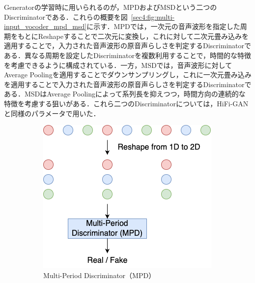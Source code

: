 \documentclass[12pt]{jarticle}
\numberwithin{equation}{section}    %
\numberwithin{figure}{section}      %
\numberwithin{table}{section}      %
\begin{document}
Generatorの学習時に用いられるのが，MPDおよびMSDという二つのDiscriminatorである．これらの概要を図~\ref{sec4:fig:multi-input_vocoder_mpd_msd}に示す．MPDでは，一次元の音声波形を指定した周期をもとにReshapeすることで二次元に変換し，これに対して二次元畳み込みを適用することで，入力された音声波形の原音声らしさを判定するDiscriminatorである．異なる周期を設定したDiscriminatorを複数利用することで，時間的な特徴を考慮できるように構成されている．一方，MSDでは，音声波形に対してAverage Poolingを適用することでダウンサンプリングし，これに一次元畳み込みを適用することで入力された音声波形の原音声らしさを判定するDiscriminatorである．MSDはAverage Poolingによって系列長を抑えつつ，時間方向の連続的な特徴を考慮する狙いがある．これら二つのDiscriminatorについては，HiFi-GANと同様のパラメータで用いた．
\begin{figure}[bt]
    \centering
    \begin{subfigure}{0.45\textwidth}
        \centering
        \includegraphics[width=\linewidth]{./figure/sec4/model/mpd.png}
        \caption{Multi-Period Discriminator（MPD）}
        \label{sec4:fig:multi-input_vocoder_mpd}
    \end{subfigure}
    \hfill
    \begin{subfigure}{0.45\textwidth}
        \centering

\end{subfigure}
\end{figure}
\end{document}
